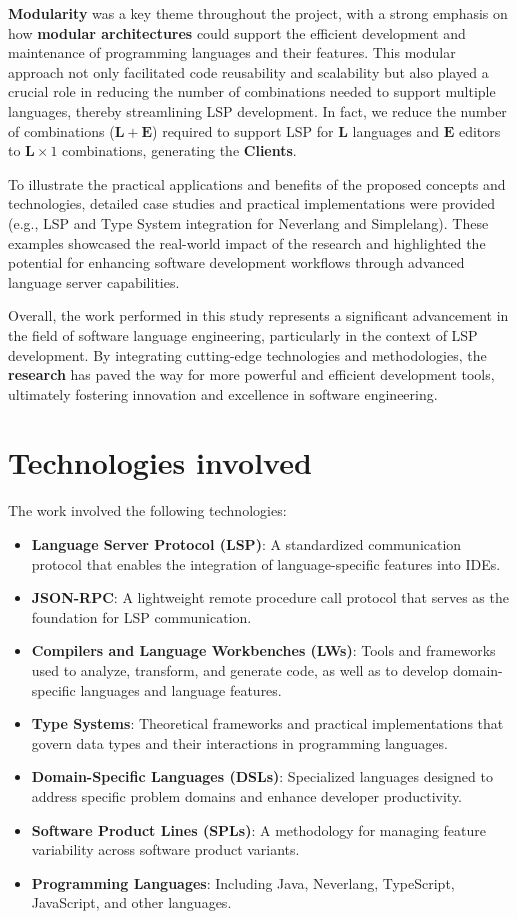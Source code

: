 \documentclass{adapt-lab}
\begin{document}
\textbf{Modularity} was a key theme throughout the project, with a strong emphasis on how \textbf{modular architectures} could support the efficient development and maintenance of programming languages and their features. This modular approach not only facilitated code reusability and scalability but also played a crucial role in reducing the number of combinations needed to support multiple languages, thereby streamlining LSP development. In fact, we reduce the number of combinations ($\mathbf{L} + \mathbf{E}$) required to support LSP for $\mathbf{L}$ languages and $\mathbf{E}$ editors to $\mathbf{L} \times 1$ combinations, generating the \textbf{Clients}.

To illustrate the practical applications and benefits of the proposed concepts and technologies, detailed case studies and practical implementations were provided (e.g., LSP and Type System integration for Neverlang and Simplelang). These examples showcased the real-world impact of the research and highlighted the potential for enhancing software development workflows through advanced language server capabilities.

Overall, the work performed in this study represents a significant advancement in the field of software language engineering, particularly in the context of LSP development. By integrating cutting-edge technologies and methodologies, the \textbf{research} has paved the way for more powerful and efficient development tools, ultimately fostering innovation and excellence in software engineering.

\section{Technologies involved}

The work involved the following technologies:
\begin{itemize}
    \item \textbf{Language Server Protocol (LSP)}: A standardized communication protocol that enables the integration of language-specific features into IDEs.
    \item \textbf{JSON-RPC}: A lightweight remote procedure call protocol that serves as the foundation for LSP communication.
    \item \textbf{Compilers and Language Workbenches (LWs)}: Tools and frameworks used to analyze, transform, and generate code, as well as to develop domain-specific languages and language features.
    \item \textbf{Type Systems}: Theoretical frameworks and practical implementations that govern data types and their interactions in programming languages.
    \item \textbf{Domain-Specific Languages (DSLs)}: Specialized languages designed to address specific problem domains and enhance developer productivity.
    \item \textbf{Software Product Lines (SPLs)}: A methodology for managing feature variability across software product variants.
    \item \textbf{Programming Languages}: Including Java, Neverlang, TypeScript, JavaScript, and other languages.
\end{itemize}
\end{document}

